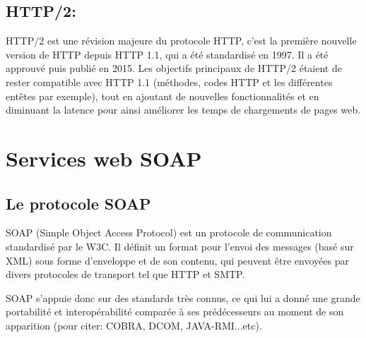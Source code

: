 \subsection{HTTP/2:}
HTTP/2 est une révision majeure du protocole HTTP, c'est la première nouvelle version de HTTP depuis HTTP 1.1, qui a été standardisé en 1997. Il a été approuvé puis publié en 2015.
Les objectifs principaux de HTTP/2 étaient de rester compatible avec HTTP 1.1 (méthodes, codes HTTP et les différentes entêtes par exemple), tout en ajoutant de nouvelles fonctionnalités et en diminuant la latence pour ainsi améliorer les temps de chargements de pages web.

\newpage
\section{Services web SOAP} 
\label{section:Soap}
\subsection{Le protocole SOAP}
SOAP (Simple Object Access Protocol) est un protocole de communication standardisé par le W3C. 
Il définit un format pour l'envoi des messages (basé sur XML) sous forme d'enveloppe et de son contenu, qui peuvent être envoyées par divers protocoles de transport tel que HTTP et SMTP.
				
SOAP s'appuie donc sur des standards très connus, ce qui lui a donné une grande portabilité et interopérabilité comparée à ses prédécesseurs au moment de son apparition (pour citer: COBRA, DCOM, JAVA-RMI...etc).
				
